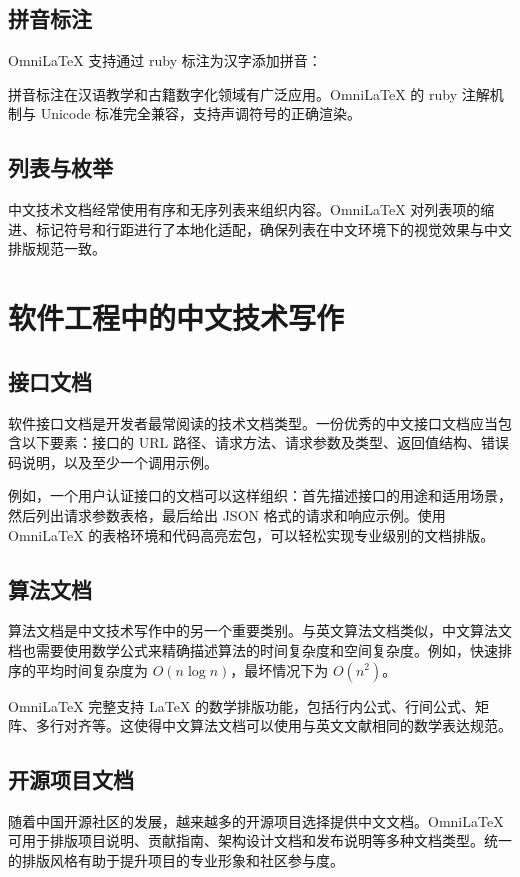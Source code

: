 \documentclass[
    language=chinese,
    doctype=article,
    institution=none,
]{../../omnilatex}
\begin{document}
\subsection{拼音标注}
OmniLaTeX 支持通过 ruby 标注为汉字添加拼音：


拼音标注在汉语教学和古籍数字化领域有广泛应用。OmniLaTeX 的 ruby 注解机制与 Unicode 标准完全兼容，支持声调符号的正确渲染。

\subsection{列表与枚举}
中文技术文档经常使用有序和无序列表来组织内容。OmniLaTeX 对列表项的缩进、标记符号和行距进行了本地化适配，确保列表在中文环境下的视觉效果与中文排版规范一致。

\section{软件工程中的中文技术写作}

\subsection{接口文档}
软件接口文档是开发者最常阅读的技术文档类型。一份优秀的中文接口文档应当包含以下要素：接口的 URL 路径、请求方法、请求参数及类型、返回值结构、错误码说明，以及至少一个调用示例。

例如，一个用户认证接口的文档可以这样组织：首先描述接口的用途和适用场景，然后列出请求参数表格，最后给出 JSON 格式的请求和响应示例。使用 OmniLaTeX 的表格环境和代码高亮宏包，可以轻松实现专业级别的文档排版。

\subsection{算法文档}
算法文档是中文技术写作中的另一个重要类别。与英文算法文档类似，中文算法文档也需要使用数学公式来精确描述算法的时间复杂度和空间复杂度。例如，快速排序的平均时间复杂度为 $O(n \log n)$，最坏情况下为 $O(n^2)$。

OmniLaTeX 完整支持 \LaTeX{} 的数学排版功能，包括行内公式、行间公式、矩阵、多行对齐等。这使得中文算法文档可以使用与英文文献相同的数学表达规范。

\subsection{开源项目文档}
随着中国开源社区的发展，越来越多的开源项目选择提供中文文档。OmniLaTeX 可用于排版项目说明、贡献指南、架构设计文档和发布说明等多种文档类型。统一的排版风格有助于提升项目的专业形象和社区参与度。
\end{document}
